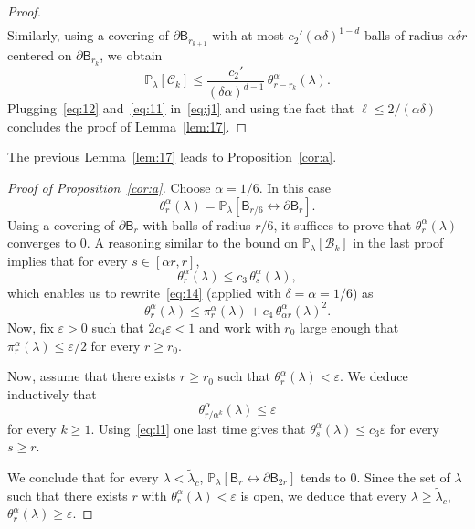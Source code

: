 \documentclass[AHL,Unicode,longabstracts]{cedram}
\newcommand{\ep}{\varepsilon}
\begin{document}
\begin{proof}
\begin{align}
\end{align}
Similarly, using a covering of $\partial\mathsf B_{r_{k+1}}$ with at most $c_2'(\alpha\delta)^{1-d}$ balls of radius $\alpha\delta r$ centered on $\partial \mathsf B_{r_k}$, we obtain
\begin{equation}\label{eq:11}
{\mathbb P}_\lambda[{\mathcal C}_k]\le \frac{c_2'}{(\delta\alpha)^{d-1}} \,\theta_{r-r_k}^\alpha(\lambda).
\end{equation}
Plugging~\eqref{eq:12} and~\eqref{eq:11} in~\eqref{eq:j1} and using the fact that $\ell\le 2/(\alpha\delta)$ concludes the proof of Lemma~\ref{lem:17}.
\end{proof}

The previous Lemma~\ref{lem:17} leads to Proposition~\ref{cor:a}.


\begin{proof}[Proof of Proposition~\ref{cor:a}]
Choose $\alpha=1/6$. In this case
\[
\theta_{r}^\alpha(\lambda)={\mathbb P}_\lambda[\mathsf B_{r/6}\longleftrightarrow\partial\mathsf B_{r}].
\]
Using a covering of $\partial\mathsf B_r$ with balls of radius $r/6$, it suffices to prove that $\theta_{r}^\alpha(\lambda)$ converges to $0$. A reasoning similar to the bound on ${\mathbb P}_\lambda[{\mathcal B}_k]$ in the last proof implies that for every $s\in[\alpha r, r]$,
\begin{equation}
\theta_r^\alpha(\lambda)\le c_3\,\theta_s^\alpha(\lambda),\label{eq:l1}
\end{equation}
which enables us to rewrite~\eqref{eq:14} (applied with $\delta=\alpha=1/6$) as
\[
\theta_r^\alpha(\lambda)\le \pi^{\alpha}_r(\lambda)+c_4 \,\theta^\alpha_{\alpha r}(\lambda)^2.
\]
Now, fix $\ep>0$ such that $2c_4\ep<1$ and work with $r_0$ large enough that $\pi^{\alpha}_r(\lambda)\le \ep/2$ for every $r\ge r_0$.

Now, assume that there exists $r\ge r_0$ such that $\theta_r^\alpha(\lambda)<\ep$. We deduce inductively that
\[
\theta_{r/\alpha^k}^\alpha(\lambda)\le \ep
\]
for every $k\ge1$.
Using~\eqref{eq:l1} one last time gives that $\theta_s^\alpha(\lambda)\le c_3\ep$ for every $s\ge r$.

We conclude that for every $\lambda<\widetilde \lambda_c$, ${\mathbb P}_\lambda[\mathsf B_r\longleftrightarrow\partial\mathsf B_{2r}]$ tends to 0. Since the set of $\lambda$ such that there exists $r$ with $\theta_r^\alpha(\lambda)<\ep$ is open, we deduce that every $\lambda\ge\widetilde\lambda_c$, $\theta_r^\alpha(\lambda)\ge\ep$.
\end{proof}
\end{document}
